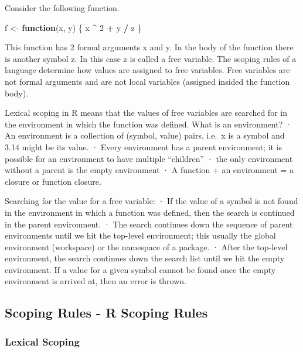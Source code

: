 \documentclass[
]{article}
\newenvironment{Shaded}{\begin{snugshade}}{\end{snugshade}}
\newcommand{\ControlFlowTok}[1]{\textcolor[rgb]{0.13,0.29,0.53}{\textbf{#1}}}
\newcommand{\DecValTok}[1]{\textcolor[rgb]{0.00,0.00,0.81}{#1}}
\newcommand{\NormalTok}[1]{#1}
\newcommand{\OtherTok}[1]{\textcolor[rgb]{0.56,0.35,0.01}{#1}}
\newcommand{\SpecialCharTok}[1]{\textcolor[rgb]{0.81,0.36,0.00}{\textbf{#1}}}
\begin{document}
Consider the following function.

\begin{Shaded}
\begin{Highlighting}[]
\NormalTok{f }\OtherTok{\textless{}{-}} \ControlFlowTok{function}\NormalTok{(x, y) \{}
\NormalTok{  x }\SpecialCharTok{\^{}} \DecValTok{2} \SpecialCharTok{+}\NormalTok{ y }\SpecialCharTok{/}\NormalTok{ z}
\NormalTok{\}}
\end{Highlighting}
\end{Shaded}

This function has 2 formal arguments x and y. In the body of the
function there is another symbol z. In this case z is called a free
variable. The scoping rules of a language determine how values are
assigned to free variables. Free variables are not formal arguments and
are not local variables (assigned insided the function body).

Lexical scoping in R means that the values of free variables are
searched for in the environment in which the function was defined. What
is an environment? · An environment is a collection of (symbol, value)
pairs, i.e.~x is a symbol and 3.14 might be its value. · Every
environment has a parent environment; it is possible for an environment
to have multiple ``children'' · the only environment without a parent is
the empty environment · A function + an environment = a closure or
function closure.

Searching for the value for a free variable: · If the value of a symbol
is not found in the environment in which a function was defined, then
the search is continued in the parent environment. · The search
continues down the sequence of parent environments until we hit the
top-level environment; this usually the global environment (workspace)
or the namespace of a package. · After the top-level environment, the
search continues down the search list until we hit the empty
environment. If a value for a given symbol cannot be found once the
empty environment is arrived at, then an error is thrown.

\hypertarget{scoping-rules---r-scoping-rules}{%
\subsection{Scoping Rules - R Scoping
Rules}\label{scoping-rules---r-scoping-rules}}

\hypertarget{lexical-scoping-1}{%
\subsubsection{Lexical Scoping}\label{lexical-scoping-1}}
\end{document}
